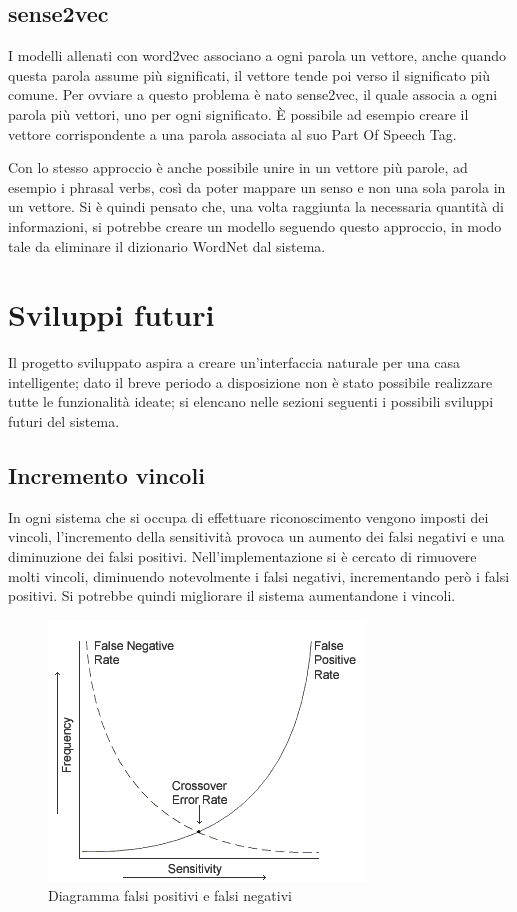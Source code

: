 \documentclass[twoside]{supsistudent}
\begin{document}
\section{sense2vec}
I modelli allenati con word2vec associano a ogni parola un vettore, anche quando questa parola assume più significati, il vettore tende poi verso il significato più comune. Per ovviare a questo problema è nato sense2vec, il quale associa a ogni parola più vettori, uno per ogni significato. È possibile ad esempio creare il vettore corrispondente a una parola associata al suo Part Of Speech Tag.  \cite{posCategories} \cite{sense2vec} 

Con lo stesso approccio è anche possibile unire in un vettore più parole, ad esempio i phrasal verbs, così da poter mappare un senso e non una sola parola in un vettore. Si è quindi pensato che, una volta raggiunta la necessaria quantità di informazioni, si potrebbe creare un modello seguendo questo approccio, in modo tale da eliminare il dizionario WordNet dal sistema.

\chapter{Sviluppi futuri}
Il progetto sviluppato aspira a creare un'interfaccia naturale per una casa intelligente; dato il breve periodo a disposizione non è stato possibile realizzare tutte le funzionalità ideate; si elencano nelle sezioni seguenti i possibili sviluppi futuri del sistema.
\section{Incremento vincoli}
In ogni sistema che si occupa di effettuare riconoscimento vengono imposti dei vincoli, l'incremento della sensitività provoca un aumento dei falsi negativi e una diminuzione dei falsi positivi.
Nell'implementazione si è cercato di rimuovere molti vincoli, diminuendo notevolmente i falsi negativi, incrementando però i falsi positivi.
Si potrebbe quindi migliorare il sistema aumentandone i vincoli.
\begin{figure}[H]
\centering
\includegraphics[scale=0.8]{falseRate}
\caption{Diagramma falsi positivi e falsi negativi}
\label{fig:pose}
\end{figure}
\end{document}
